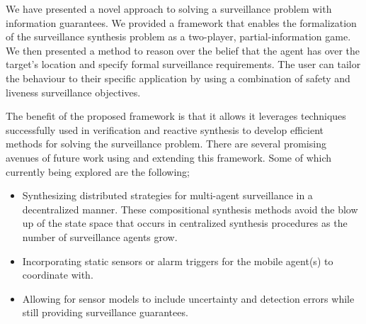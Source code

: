 We have presented a novel approach to solving a surveillance problem with information guarantees. We provided a framework that enables the  formalization of the surveillance synthesis problem as a two-player, partial-information game. We then presented a method to reason over the belief that the agent has over the target's location and specify formal surveillance requirements. The user can tailor the behaviour to their specific application by using a combination of safety and liveness surveillance objectives.

The benefit of the proposed framework is that it allows it leverages techniques successfully used in verification and reactive synthesis to develop efficient methods for solving the surveillance problem. There are several promising  avenues of future work using and extending this framework. Some of which currently being explored are the following;
\begin{itemize}
\item Synthesizing distributed strategies for multi-agent surveillance in a decentralized manner. These compositional synthesis methods avoid the blow up of the state space that occurs in centralized synthesis procedures as the number of surveillance agents grow.
\item Incorporating static sensors or alarm triggers for the mobile agent(s) to coordinate with.
\item Allowing for sensor models to include uncertainty and detection errors while still providing surveillance guarantees.

\end{itemize}